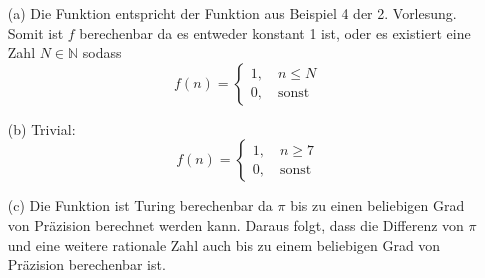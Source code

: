 \documentclass[a4paper,onecolumn,oneside,12pt,ngerman]{article}
\theoremstyle{plain} %
\theoremstyle{definition} %
\theoremstyle{remark} %
\theoremstyle{plain}
\newcommand{\NN}{\mathbb{N}} %
\begin{document}
\begin{enumerate}
  \item[(a)] Die Funktion entspricht der Funktion aus Beispiel 4 der 2. Vorlesung.
  Somit ist $f$ berechenbar da es entweder konstant 1 ist, oder es existiert eine Zahl 
  $N \in \NN$ sodass
  \[f(n) = \begin{cases} 1, \quad n\leq N \\ 0, \quad \text{sonst} \end{cases}\]
  \item[(b)] Trivial:
  \[f(n) = \begin{cases}
    1, \quad n\geq 7 \\
    0, \quad \text{sonst}
  \end{cases}\]
  \item[(c)] Die Funktion ist Turing berechenbar da $\pi$ bis zu einen beliebigen Grad
  von Präzision berechnet werden kann. Daraus folgt, dass die Differenz von $\pi$ und eine 
  weitere rationale Zahl auch bis zu einem beliebigen Grad von Präzision berechenbar ist. 
\end{enumerate}
\end{document}
